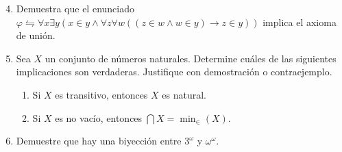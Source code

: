 \documentclass[12pt]{article}
\begin{document}
    \begin{enumerate}[\bf\text{Ej.} 1.]
    \setcounter{enumi}{3}

    \item Demuestra que el enunciado $\varphi \leftrightharpoons \forall x\exists y (x\in y \wedge \forall z \forall w ((z\in w \wedge w\in y) \rightarrow z\in y))$ implica el axioma de unión.
    
    \item Sea $X$ un conjunto de números naturales. Determine cuáles de las siguientes implicaciones son verdaderas. Justifique con demostración o contraejemplo.
    \begin{enumerate}
        \item Si $X$ es transitivo, entonces $X$ es natural.
        \item Si $X$ es no vacío, entonces $\bigcap X = \min_\in (X)$.
    \end{enumerate}

    \item Demuestre que hay una biyección entre $3^\omega$ y $\omega^\omega$.

    \end{enumerate}
  
\end{document}
